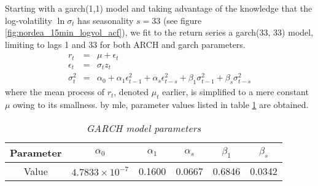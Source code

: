 Starting with a \gls{garch}(1,1) model and taking advantage of the knowledge
that the log-volatility $\ln \sigma_t$ has seasonality $s=33$ (see
figure \ref{fig:nordea_15min_logvol_acf}), we fit to the return series
a \gls{garch}(33, 33) model, limiting to lags 1 and 33 for both ARCH and
\gls{garch} parameters.
\begin{eqnarray*}
  r_t &=& \mu + \epsilon_t \\
  \epsilon_t &=& \sigma_t z_t \\
  \sigma^2_t &=& \alpha_0 + \alpha_1 \epsilon^2_{t-1} + \alpha_s
  \epsilon^2_{t-s} + \beta_1 \sigma^2_{t-1} + \beta_s \sigma^2_{t-s}
\end{eqnarray*}
where the mean process of $r_t$, denoted $\mu_t$ earlier, is simplified
to a mere constant $\mu$ owing to its smallness. by \gls{mle},
parameter values listed in table \ref{tab:nordea_15min_garch} are obtained.
\begin{table}[htb!]
  \centering
  \begin{tabular}{|c|c|c|c|c|c|}
    \hline
    Parameter & $\alpha_0$ & $\alpha_1$ & $\alpha_s$ & $\beta_1$ &
    $\beta_s$ \\
    \hline
    Value & $4.7833 \times 10^{-7}$ & 0.1600 & 0.0667 & 0.6846 &
    0.0342 \\
    \hline
  \end{tabular}
  \caption{\small \it GARCH model parameters}
  \label{tab:nordea_15min_garch}
\end{table}

